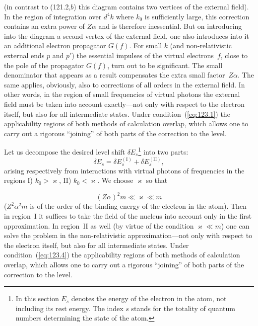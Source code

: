 \begin{equation}
\label{eq:123.2}
\end{equation}

\noindent (in contrast to (121.2,$b$) this diagram contains two vertices of the external field). In the region of integration over $d^4k$ where $k_0$ is sufficiently large, this correction contains an extra power of $Z\alpha$ and is therefore inessential. But on introducing into the diagram a second vertex of the external field, one also introduces into it an additional electron propagator $G(f)$. For small $k$ (and non-relativistic external ends $p$ and $p'$) the essential impulses of the virtual electrons~$f$, close to the pole of the propagator $G(f)$, turn out to be significant. The small denominator that appears as a result compensates the extra small factor~$Z\alpha$. The same applies, obviously, also to corrections of all orders in the external field. In other words, in the region of small frequencies of virtual photons the external field must be taken into account exactly---not only with respect to the electron itself, but also for all intermediate states. Under condition~(\ref{eq:123.1}) the applicability regions of both methods of calculation overlap, which allows one to carry out a rigorous ``joining'' of both parts of the correction to the level.

Let us decompose the desired level shift $\delta E_s$\footnote{In this section $E_s$ denotes the energy of the electron in the atom, not including its rest energy. The index $s$ stands for the totality of quantum numbers determining the state of the atom.} into two parts:
\begin{equation}
\delta E_s = \delta E_s^{(\mathrm{I})} + \delta E_s^{(\mathrm{II})},
\label{eq:123.3}
\end{equation}
arising respectively from interactions with virtual photons of frequencies in the regions I) $k_0 > \varkappa$, II) $k_0 < \varkappa$. We choose $\varkappa$ so that


\begin{equation}
(Z\alpha)^2 m \ll \varkappa \ll m
\label{eq:123.4}
\end{equation}
($Z^2\alpha^2 m$ is of the order of the binding energy of the electron in the atom). Then in region~I it suffices to take the field of the nucleus into account only in the first approximation. In region~II as well (by virtue of the condition $\varkappa \ll m$) one can solve the problem in the non-relativistic approximation---not only with respect to the electron itself, but also for all intermediate states. Under condition~(\ref{eq:123.4}) the applicability regions of both methods of calculation overlap, which allows one to carry out a rigorous ``joining'' of both parts of the correction to the level.


